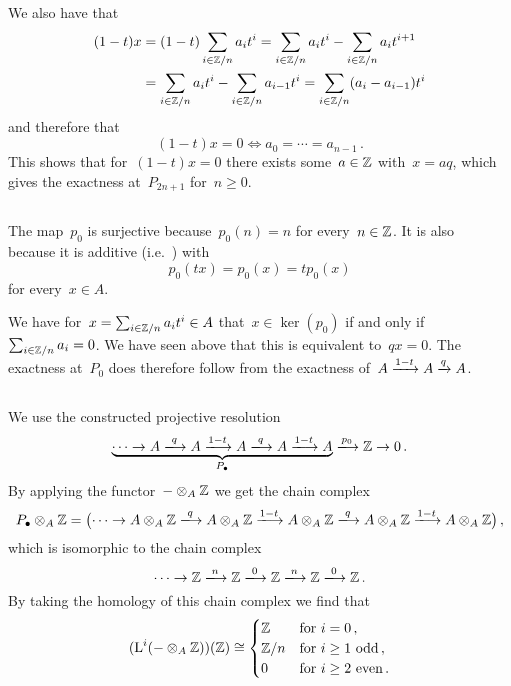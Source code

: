 We also have that
\begin{align*}
  (1-t)x
  &=
  (1-t) \sum_{i \in \mathbb{Z}/n} a_i t^i
  =
  \sum_{i \in \mathbb{Z}/n} a_i t^i - \sum_{i \in \mathbb{Z}/n} a_i t^{i+1}
  \\
  &=
  \sum_{i \in \mathbb{Z}/n} a_i t^i - \sum_{i \in \mathbb{Z}/n} a_{i-1} t^i
  =
  \sum_{i \in \mathbb{Z}/n} (a_i - a_{i-1}) t^i
\end{align*}
and therefore that
\[
  (1-t)x = 0
  \iff
  a_0 = \dotsb = a_{n-1} \,.
\]
This shows that for~$(1-t)x = 0$ there exists some~$a \in \mathbb{Z}$ with~$x = a q$, which gives the exactness at~$P_{2n+1}$ for~$n \geq 0$.





\subsection{}

The map~$p_0$ is surjective because~$p_0(n) = n$ for every~$n \in \mathbb{Z}$.
It is also~ because it is additive (i.e.~) with
\[
  p_0(tx)
  =
  p_0(x)
  =
  t p_0(x)
\]
for every~$x \in A$.

We have for~$x = \sum_{i \in \mathbb{Z}/n} a_i t^i \in A$ that~$x \in \ker(p_0)$ if and only if~$\sum_{i \in \mathbb{Z}/n} a_i = 0$.
We have seen above that this is equivalent to~$qx = 0$.
The exactness at~$P_0$ does therefore follow from the exactness of~$A \xrightarrow{1-t} A \xrightarrow{q} A$.





\subsection{}

We use the constructed projective resolution
\[
  \underbrace{
  \dotsb
  \to
  A
  \xlongto{q}
  A
  \xlongto{1-t}
  A
  \xlongto{q}
  A
  \xlongto{1-t}
  A
  }_{\Pcc}
  \xlongto{p_0}
  \Integer
  \to
  0 \,.
\]
By applying the functor~$- \otimes_A \mathbb{Z}$ we get the chain complex
\[
  \Pcc \otimes_A \Integer
  =
  \bigl(
  \dotsb
  \to
  A \otimes_A \Integer
  \xlongto{q}
  A \otimes_A \Integer
  \xlongto{1-t}  
  A \otimes_A \Integer
  \xlongto{q}
  A \otimes_A \Integer
  \xlongto{1-t}
  A \otimes_A \Integer
  \bigr)  \,,
\]
which is isomorphic to the chain complex
\[
  \dotsb
  \to
  \Integer
  \xlongto{n}
  \Integer
  \xlongto{0}
  \Integer
  \xlongto{n}
  \Integer
  \xlongto{0}
  \Integer \,.
\]
By taking the homology of this chain complex we find that
\[
  (\operatorname{L}^i (- \otimes_A \mathbb{Z}))(\mathbb{Z})
  \cong
  \begin{cases}
    \mathbb{Z}    & \text{for~$i = 0$}  \,, \\
    \mathbb{Z}/n  & \text{for~$i \geq 1$ odd} \,, \\
    0           & \text{for~$i \geq 2$ even}  \,.
  \end{cases}
\]
